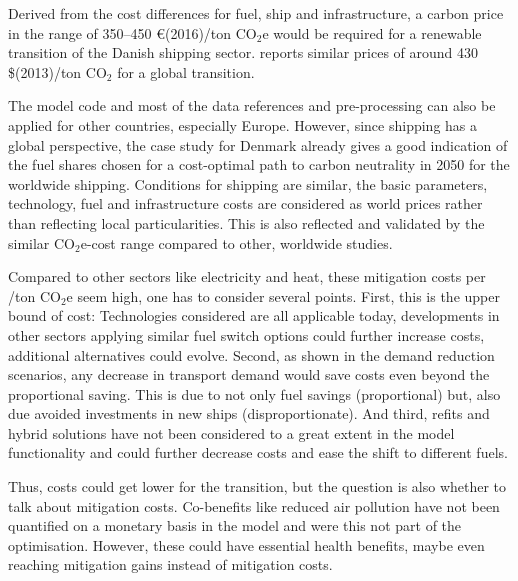 \documentclass[article]{elsarticle}
\begin{document}

Derived from the cost differences for fuel, ship and infrastructure, a carbon price in the range of 350--450 \euro(2016)/ton CO$_2$e would be required for a renewable transition of the Danish shipping sector. \citep[p.197]{Raucci2017} reports similar prices of around 430 \$(2013)/ton CO$_2$ for a global transition.

The model code and most of the data references and pre-processing can also be applied for other countries, especially Europe. However, since shipping has a global perspective, the case study for Denmark already gives a good indication of the fuel shares chosen for a cost-optimal path to carbon neutrality in 2050 for the worldwide shipping. Conditions for shipping are similar, the basic parameters, technology, fuel and infrastructure costs are considered as world prices rather than reflecting local particularities. This is also reflected and validated by the similar CO$_2$e-cost range compared to other, worldwide studies. 

Compared to other sectors like electricity and heat, these mitigation costs per /ton CO$_2$e seem high, one has to consider several points. First, this is the upper bound of cost: Technologies considered are all applicable today, developments in other sectors applying similar fuel switch options could further increase costs, additional alternatives could evolve. Second, as shown in the demand reduction scenarios, any decrease in transport demand would save costs even beyond the proportional saving. This is due to not only fuel savings (proportional) but, also due avoided investments in new ships (disproportionate). And third, refits and hybrid solutions have not been considered to a great extent in the model functionality and could further decrease costs and ease the shift to different fuels.


Thus, costs could get lower for the transition, but the question is also whether to talk about mitigation costs. Co-benefits like reduced air pollution have not been quantified on a monetary basis in the model and were this not part of the optimisation. However, these could have essential health benefits, maybe even reaching mitigation gains instead of mitigation costs.
\end{document}
